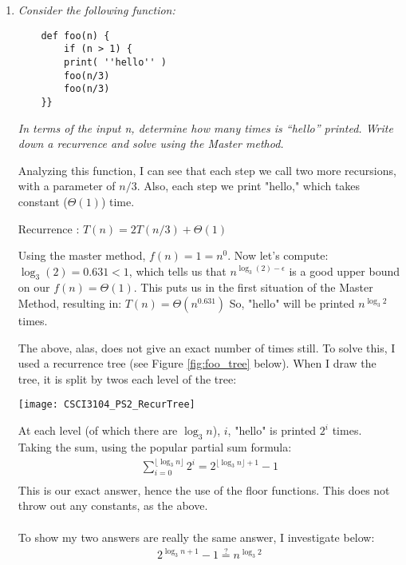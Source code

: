 \documentclass[12pt]{article}
\begin{document}
\begin{enumerate}
	\newpage
	
	\item \textit{Consider the following function:}
	

	\begin{verbatim}
    def foo(n) {
        if (n > 1) {
        print( ''hello'' )
        foo(n/3)
        foo(n/3)
    }}
	\end{verbatim}

      \textit{In terms of the input n, determine how many times is ``hello'' printed. Write down a recurrence and solve using the Master method.}
      
      Analyzing this function, I can see that each step we call two more recursions, with a parameter of $n/3$. Also, each step we print "hello," which takes constant ($\Theta(1)$) time.

      Recurrence : $T(n) = 2T(n/3) + \Theta(1)$
      
      Using the master method, $f(n) = 1 = n^0$. Now let's compute: $\log _3(2) = 0.631 < 1$, which tells us that $n^{\log _3(2) - \epsilon}$ is a good upper bound on our $f(n) = \Theta(1)$. This puts us in the first situation of the Master Method, resulting in:
      $\boxed{T(n) = \Theta(n^{0.631})}$
      So, "hello" will be printed $n^{\log_3 2}$ times.
	
	The above, alas, does not give an exact number of times still. To solve this, I used a recurrence tree (see Figure \ref{fig:foo_tree} below). When I draw the tree, it is split by twos each level of the tree:
	
	\begin{figure*}[!th]
		\centering
			\texttt{[image: CSCI3104\_PS2\_RecurTree]}
			\caption{Figure \ref{fig:foo_tree} shows $3$ levels of the recurrence tree for the function foo.}
			\centering
			\label{fig:foo_tree}
	\end{figure*}
	
	 At each level (of which there are $\log_3 n$), $i$, "hello" is printed $2^i$ times. \\
	Taking the sum, using the popular partial sum formula:
	\begin{gather*}
		\sum_{i=0}^{\lfloor\log_3 n\rfloor} 2^i = \boxed{2^{{\lfloor\log_3 n\rfloor} + 1} -1} \\
		\end{gather*}
		This is our exact answer, hence the use of the floor functions. This does not throw out any constants, as the above.\\
	\\
		To show my two answers are really the same answer, I investigate below:\\
		\begin{gather*}
		2^{{\log_3 n} + 1} -1 \stackrel{?}{=} n^{\log_3 2}
		\end{gather*}
		

\end{enumerate}
\end{document}
